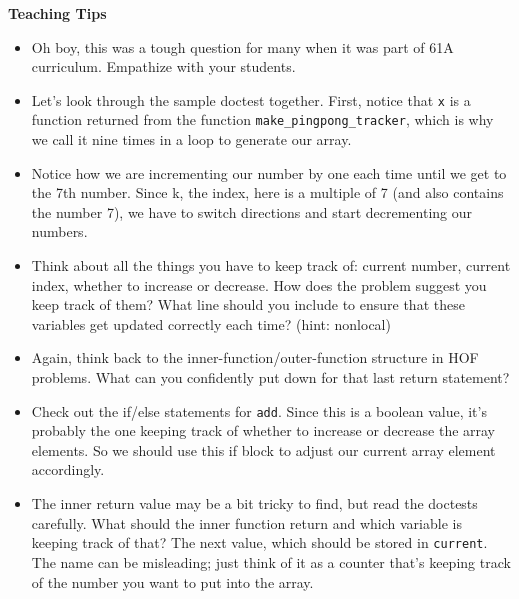\begin{blocksection}
\begin{guide}
\textbf{Teaching Tips}
\begin{itemize}
\item Oh boy, this was a tough question for many when it was part of 61A curriculum. Empathize with your students. \heartsuit
\item Let's look through the sample doctest together. First, notice that \texttt{x} is a function returned from the function \texttt{make_pingpong_tracker}, which is why we call it nine times in a loop to generate our array.
\item Notice how we are incrementing our number by one each time until we get to the 7th number. Since k, the index, here is a multiple of 7 (and also contains the number 7), we have to switch directions and start decrementing our numbers.
\item Think about all the things you have to keep track of: current number, current index, whether to increase or decrease. How does the problem suggest you keep track of them? What line should you include to ensure that these variables get updated correctly each time? (hint: nonlocal)
\item Again, think back to the inner-function/outer-function structure in HOF problems. What can you confidently put down for that last return statement?
\item Check out the if/else statements for \texttt{add}. Since this is a boolean value, it's probably the one keeping track of whether to increase or decrease the array elements. So we should use this if block to adjust our current array element accordingly.
\item The inner return value may be a bit tricky to find, but read the doctests carefully. What should the inner function return and which variable is keeping track of that? The next value, which should be stored in \texttt{current}. The name can be misleading; just think of it as a counter that's keeping track of the number you want to put into the array.
\end{itemize}
\end{guide}
\end{blocksection}
